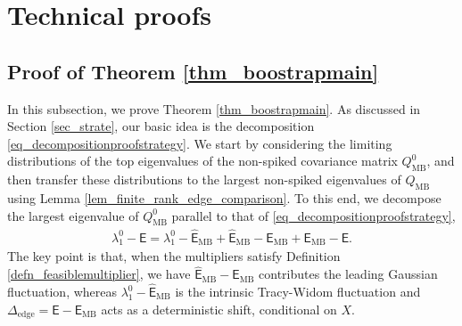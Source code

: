 \documentclass[12pt]{article}
\theoremstyle{plain}
\numberwithin{equation}{section}
\begin{document}
\section{Technical proofs}
\subsection{Proof of Theorem \ref{thm_boostrapmain}}\label{appendix_proofoftheorem32}

In this subsection, we prove Theorem \ref{thm_boostrapmain}. As discussed in Section \ref{sec_strate}, our basic idea is the decomposition \eqref{eq_decompositionproofstrategy}.  We start by considering the limiting distributions of the top eigenvalues of the non-spiked covariance matrix $Q_{\mathrm{MB}}^0$, and then transfer these distributions to the largest non-spiked eigenvalues of $Q_{\mathrm{MB}}$ using Lemma \ref{lem_finite_rank_edge_comparison}. To this end, we decompose the largest eigenvalue of $Q_{\mathrm{MB}}^0$ parallel to that of \eqref{eq_decompositionproofstrategy},
\begin{align}\label{eq_decomp_largesteigenvalue}
	\lambda_1^0-\mathsf{E}=\lambda_1^0-\widehat{\mathsf{E}}_{\mathrm{MB}}+\widehat{\mathsf{E}}_{\mathrm{MB}}-\mathsf{E}_{\mathrm{MB}}+\mathsf{E}_{\mathrm{MB}}-\mathsf{E}.
\end{align}
The key point is that, when the multipliers satisfy Definition \ref{defn_feasiblemultiplier}, we have $\widehat{\mathsf{E}}_{\mathrm{MB}}-\mathsf{E}_{\mathrm{MB}}$ contributes the leading Gaussian fluctuation, whereas $\lambda_1^0-\widehat{\mathsf{E}}_{\mathrm{MB}}$ is the intrinsic Tracy-Widom fluctuation and $\Delta_{\mathrm{edge}}=\mathsf{E}-\mathsf{E}_{\mathrm{MB}}$ acts as a deterministic shift, conditional on $X$. 
\end{document}
